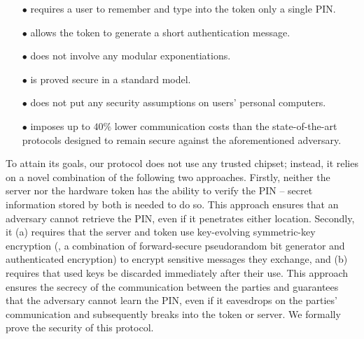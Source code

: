\begin{itemize}
\item[$\bullet$] requires a user to remember and type into the token only a single PIN.

\item[$\bullet$] {allows the token to generate a short authentication message.} 

\item[$\bullet$] does not involve any modular exponentiations.

\item[$\bullet$] is proved secure in a standard model.

\item[$\bullet$] does not put any security assumptions on users' personal computers.

\item[$\bullet$]  imposes up to $40\%$ lower communication costs than the state-of-the-art protocols designed to remain secure against the aforementioned adversary. 


\end{itemize}

To attain its goals, our protocol does not use any trusted chipset; instead, it relies on a novel combination of the following two approaches. Firstly, neither the server nor the hardware token has the ability to verify the PIN -- secret information stored by both is needed to do so. This approach ensures that an adversary cannot retrieve the PIN, even if it penetrates either location. 
Secondly, it  (a) requires that the server and token use key-evolving symmetric-key encryption (\ie, a combination of forward-secure pseudorandom bit generator and authenticated encryption) to encrypt sensitive messages they exchange,  and (b) requires that used keys be discarded immediately after their use.
This approach ensures the secrecy of the communication between the parties and guarantees that the adversary cannot learn the PIN, even if it eavesdrops on the parties' communication and subsequently breaks into the token or server. We formally prove the security of this protocol. 





